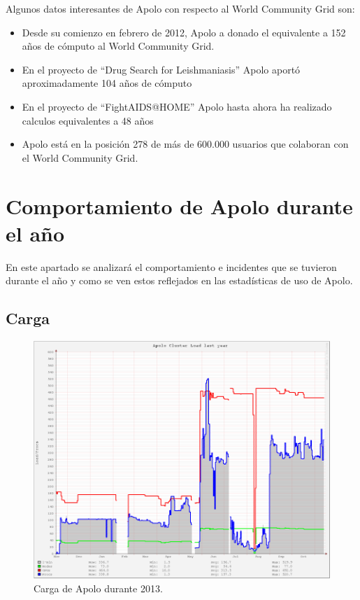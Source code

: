Algunos datos interesantes de Apolo con respecto al World Community Grid son:

\begin{itemize}
\item Desde su comienzo en febrero de 2012, Apolo a donado el equivalente a 152 años de cómputo al World Community Grid.
\item En el proyecto de ``Drug Search for Leishmaniasis'' Apolo aportó aproximadamente 104 años de cómputo
\item En el proyecto de ``FightAIDS@HOME'' Apolo hasta ahora ha realizado calculos equivalentes a 48 años
\item Apolo está en la posición 278 de más de 600.000 usuarios que colaboran con el World Community Grid.
\end{itemize}

\section{Comportamiento de Apolo durante el año}
En este apartado se analizará el comportamiento e incidentes que se tuvieron durante el año y como se ven estos reflejados en las estadísticas de uso de Apolo.

\subsection{Carga}
\begin{figure}[ht]
  \centering
  \includegraphics[scale=0.45]{imgs/load2013.png}
  \caption{Carga de Apolo durante 2013.}
  \label{fig:load}
\end{figure}

